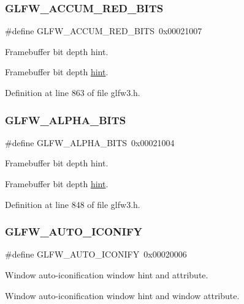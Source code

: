 \subsubsection{\texorpdfstring{GLFW\_ACCUM\_RED\_BITS}{GLFW\_ACCUM\_RED\_BITS}}
{\footnotesize\ttfamily \#define G\+L\+F\+W\+\_\+\+A\+C\+C\+U\+M\+\_\+\+R\+E\+D\+\_\+\+B\+I\+TS~0x00021007}



Framebuffer bit depth hint. 

Framebuffer bit depth \mbox{\hyperlink{group__window_gaead34a9a683b2bc20eecf30ba738bfc6}{hint}}. 

Definition at line 863 of file glfw3.\+h.

\mbox{\label{group__window_gafed79a3f468997877da86c449bd43e8c}} 
\subsubsection{\texorpdfstring{GLFW\_ALPHA\_BITS}{GLFW\_ALPHA\_BITS}}
{\footnotesize\ttfamily \#define G\+L\+F\+W\+\_\+\+A\+L\+P\+H\+A\+\_\+\+B\+I\+TS~0x00021004}



Framebuffer bit depth hint. 

Framebuffer bit depth \mbox{\hyperlink{group__window_gafed79a3f468997877da86c449bd43e8c}{hint}}. 

Definition at line 848 of file glfw3.\+h.

\mbox{\label{group__window_ga9d9874fc928200136a6dcdad726aa252}} 
\subsubsection{\texorpdfstring{GLFW\_AUTO\_ICONIFY}{GLFW\_AUTO\_ICONIFY}}
{\footnotesize\ttfamily \#define G\+L\+F\+W\+\_\+\+A\+U\+T\+O\+\_\+\+I\+C\+O\+N\+I\+FY~0x00020006}



Window auto-\/iconification window hint and attribute. 

Window auto-\/iconification window hint and window attribute. 


